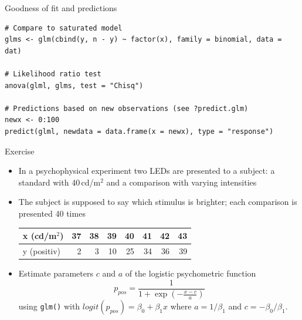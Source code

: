 \documentclass[aspectratio=169]{beamer}
\begin{document}
\begin{frame}[fragile]{Goodness of fit and predictions}
\begin{lstlisting}
# Compare to saturated model
glms <- glm(cbind(y, n - y) ~ factor(x), family = binomial, data = dat)

# Likelihood ratio test
anova(glml, glms, test = "Chisq")

# Predictions based on new observations (see ?predict.glm)
newx <- 0:100
predict(glml, newdata = data.frame(x = newx), type = "response")
\end{lstlisting}
\end{frame}

\begin{frame}[fragile]{}
  \begin{block}{Exercise}
    \begin{itemize}
\item In a psychophysical experiment two LEDs are presented to a
  subject: a standard with 40\,cd/m$^2$ and a comparison with varying
        intensities
    \item The subject is supposed to say which stimulus is
      brighter; each comparison is presented 40 times
        \vspace{.2cm}
\begin{center}
\begin{tabular}{l|rrrrrrr}
x (cd/m$^2$)  & 37 & 38 & 39 & 40 & 41 & 42 & 43 \\ \hline
y (positiv)   &  2 &  3 & 10 & 25 & 34 & 36 & 39
\end{tabular}
\end{center}
        \vspace{.2cm}
\item Estimate parameters $c$ and $a$ of the logistic psychometric function
\[
  p_{pos} = \frac{1}{1 +
    \exp(-\frac{\displaystyle x - c}{\displaystyle a})}
\]
using \texttt{glm()} with $logit(p_{pos}) = \beta_0 + \beta_1x$ where
        $a = 1/\beta_1$ and $c = -\beta_0/\beta_1$.
    \end{itemize}
  \end{block}
\end{frame}
\end{document}
